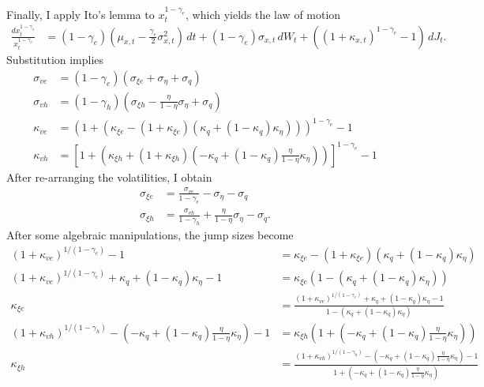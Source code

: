 \documentclass[12 pt, oneside]{article}
\theoremstyle{definition}
\theoremstyle{definition}
\theoremstyle{definition}
\begin{document}
Finally, I apply Ito's lemma to $x_t^{ 1 - \gamma_e}$, which yields the law of motion
\begin{align*}
  \frac{dx_t^{1 - \gamma_e}}{x_t^{1 - \gamma_e}} & = (1 - \gamma_e)(\mu_{x, t} - \frac{\gamma_e}{2} \sigma_{x, t}^2)\, dt + (1 - \gamma_e)\sigma_{x, t}\, dW_t +( (1 + \kappa_{x, t})^{1 - \gamma_e} - 1) \, dJ_t.
\end{align*}
Substitution implies
\begin{align*}
  \sigma_{ve} & = (1 - \gamma_e)(\sigma_{\xi e} + \sigma_{\eta} + \sigma_q)\\
  \sigma_{vh} & = (1 - \gamma_h)\left(\sigma_{\xi h} -\frac{\eta}{1 - \eta}\sigma_{\eta} + \sigma_q\right)\\
  \kappa_{ve} & = (1 + (\kappa_{\xi e} - (1 + \kappa_{\xi e})(\kappa_q + (1  - \kappa_q) \kappa_\eta)))^{1 - \gamma_e} - 1\\
  \kappa_{vh} & = \left[1 + \left(\kappa_{\xi h} + (1 + \kappa_{\xi h})(-\kappa_q + (1  - \kappa_q)\frac{\eta}{1 - \eta} \kappa_\eta)\right)\right]^{1 - \gamma_e} - 1
\end{align*}
After re-arranging the volatilities, I obtain
\begin{align*}
  \sigma_{\xi e} & = \frac{\sigma_{ve}}{1 - \gamma_e} - \sigma_\eta - \sigma_q\\
  \sigma_{\xi h} & = \frac{\sigma_{vh}}{1 - \gamma_h} + \frac{\eta}{1 - \eta}\sigma_\eta - \sigma_q.
\end{align*}
After some algebraic manipulations, the jump sizes become
\begin{align*}
(1 + \kappa_{ve})^{1 / (1 - \gamma_e)} - 1 & = \kappa_{\xi e} - (1 + \kappa_{\xi e})(\kappa_q + (1  - \kappa_q) \kappa_\eta)\\
(1 + \kappa_{ve})^{1 / (1 - \gamma_e)} + \kappa_q + (1 - \kappa_q)\kappa_\eta - 1
                                           & = \kappa_{\xi e}(1 - (\kappa_q + (1 - \kappa_q)\kappa_\eta))\\
\kappa_{\xi e} & = \frac{(1 + \kappa_{ve})^{1 / (1 - \gamma_e)} + \kappa_q + (1 - \kappa_q)\kappa_\eta - 1}{1 - (\kappa_q + (1 - \kappa_q)\kappa_\eta)}\\
(1 + \kappa_{v h})^{1 / (1 - \gamma_h)} - \left(-\kappa_q + (1 - \kappa_q)\frac{\eta}{1 - \eta}\kappa_\eta\right) - 1
                                           & = \kappa_{\xi h}\left(1 + \left( -\kappa_q + (1 - \kappa_q)\frac{\eta}{1 - \eta}\kappa_\eta\right)\right)\\
\kappa_{\xi h} & = \frac{(1 + \kappa_{v h})^{1 / (1 - \gamma_h)} - \left(-\kappa_q + (1 - \kappa_q)\frac{\eta}{1 - \eta}\kappa_\eta\right) - 1}{1 + \left( -\kappa_q + (1 - \kappa_q)\frac{\eta}{1 - \eta}\kappa_\eta\right)}
\end{align*}
\end{document}
